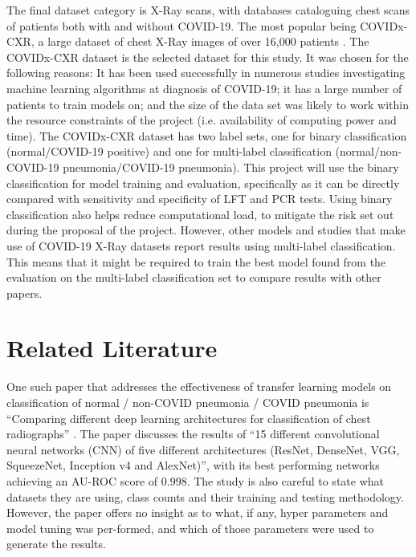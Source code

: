 The final dataset category is X-Ray scans, with databases cataloguing chest scans of patients both with and without COVID-19. The most popular being COVIDx-CXR, a large dataset of chest X-Ray images of over 16,000 patients \citep{wang2020covid}. The COVIDx-CXR dataset is the selected dataset for this study. It was chosen for the following reasons: It has been used successfully in numerous studies investigating machine learning algorithms at diagnosis of COVID-19; it has a large number of patients to train models on; and the size of the data set was likely to work within the resource constraints of the project (i.e. availability of computing power and time). The COVIDx-CXR dataset has two label sets, one for binary classification (normal/COVID-19 positive) and one for multi-label classification (normal/non-COVID-19 pneumonia/COVID-19 pneumonia). This project will use the binary classification for model training and evaluation, specifically as it can be directly compared with sensitivity and specificity of LFT and PCR tests. Using binary classification also helps reduce computational load, to mitigate the risk set out during the proposal of the project. However, other models and studies that make use of COVID-19 X-Ray datasets report results using multi-label classification. This means that it might be required to train the best model found from the evaluation on the multi-label classification set to compare results with other papers.

\section{Related Literature}
One such paper that addresses the effectiveness of transfer learning models on classification of normal / non-COVID pneumonia / COVID pneumonia is “Comparing different deep learning architectures for classification of chest radiographs” \citep{bressem2020comparing}. The paper discusses the results of “15 different convolutional neural networks (CNN) of five different architectures (ResNet, DenseNet, VGG, SqueezeNet, Inception v4 and AlexNet)”, with its best performing networks achieving an AU-ROC score of 0.998. The study is also careful to state what datasets they are using, class counts and their training and testing methodology. However, the paper offers no insight as to what, if any, hyper parameters and model tuning was per-formed, and which of those parameters were used to generate the results. 

